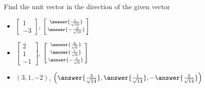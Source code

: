 \documentclass{ximera}
\begin{document}

\begin{exercise}
    Find the unit vector in the direction of the given vector
    \begin{itemize}
        \item $\begin{bmatrix} 1 \\ -3 \end{bmatrix}$, $\left[\begin{smallmatrix} \answer{\frac{1}{\sqrt{10}}} \\ \answer{-\frac{3}{\sqrt{10}}} \end{smallmatrix}\right]$
        \item $\begin{bmatrix} 2 \\ 1 \\ -1 \end{bmatrix}$, $\left[\begin{smallmatrix} \answer{\frac{2}{\sqrt{6}}} \\ \answer{\frac{1}{\sqrt{6}}} \\ \answer{-\frac{1}{\sqrt{6}}} \end{smallmatrix}\right]$
        \item $(3,1,-2)$, $\left( \answer{\frac{3}{\sqrt{14}}}, \answer{\frac{1}{\sqrt{14}}}, -\answer{\frac{2}{\sqrt{14}}}\right)$
    \end{itemize}
\end{exercise}
\end{document}
